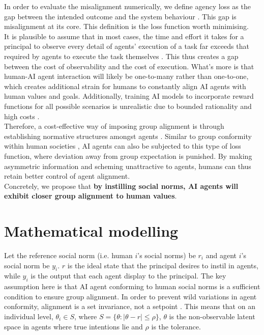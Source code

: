 \documentclass{article}
\begin{document}
In order to evaluate the misalignment numerically, we define agency loss as the gap between the intended outcome and the system behaviour \citep{lupia2001,moloi2020}. This gap is misalignment at its core. This definition is the loss function worth minimising. \\

It is plausible to assume that in most cases, the time and effort it takes for a principal to observe every detail of agents' execution of a task far exceeds that required by agents to execute the task themselves \citep{kwa2025}. This thus creates a gap between the cost of observability and the cost of execution. What's more is that human-AI agent interaction will likely be one-to-many rather than one-to-one, which creates additional strain for humans to constantly align AI agents with human values and goals. Additionally, training AI models to incorporate reward functions for all possible scenarios is unrealistic due to bounded rationality and high costs \citep{simon1955,hadfield2019}. \\

Therefore, a cost-effective way of imposing group alignment is through establishing normative structures amongst agents \citep{hadfield2019}. Similar to group conformity within human societies \citep{axelrod1986}, AI agents can also be subjected to this type of loss function, where deviation away from group expectation is punished. By making asymmetric information and scheming \citep{meinke2024} unattractive to agents, humans can thus retain better control of agent alignment. \\

Concretely, we propose that \textbf{by instilling social norms, AI agents will exhibit closer group alignment to human values}.

\section{Mathematical modelling}

Let the reference social norm (i.e. human $i$'s social norms) be $r_i$ and agent $i$'s social norm be $y_i$. $r$ is the ideal state that the principal desires to instil in agents, while $y_i$ is the output that each agent display to the principal. The key assumption here is that AI agent conforming to human social norms is a sufficient condition to ensure group alignment. In order to prevent wild variations in agent conformity, alignment is a set invariance, not a setpoint \citep{blanchini1999}. This means that on an individual level, $\theta_i \in S$, where $S = \{ \theta:  \lvert \theta-r \rvert \leq \rho \}$, $\theta$ is the non-observable latent space in agents where true intentions lie and $\rho$ is the tolerance.  \\
\end{document}

